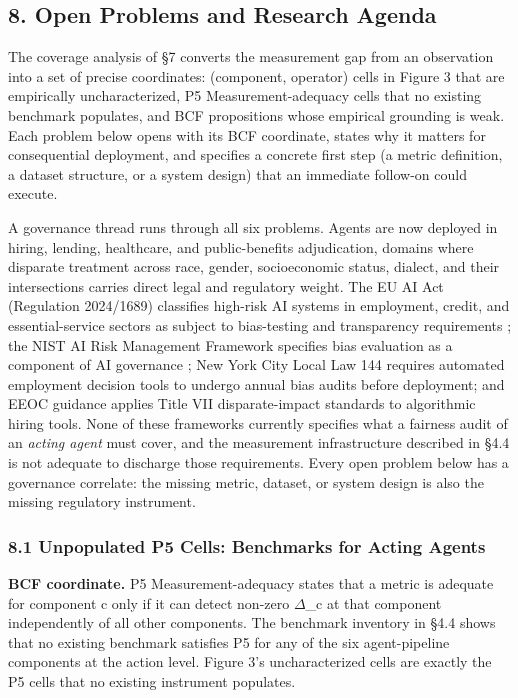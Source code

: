 \documentclass[10pt]{article}
\begin{document}
\subsection*{8. Open Problems and Research Agenda}

The coverage analysis of \S{}7 converts the measurement gap from an observation into a set of precise coordinates: (component, operator) cells in Figure 3 that are empirically uncharacterized, P5 Measurement-adequacy cells that no existing benchmark populates, and BCF propositions whose empirical grounding is weak. Each problem below opens with its BCF coordinate, states why it matters for consequential deployment, and specifies a concrete first step (a metric definition, a dataset structure, or a system design) that an immediate follow-on could execute.

A governance thread runs through all six problems. Agents are now deployed in hiring, lending, healthcare, and public-benefits adjudication, domains where disparate treatment across race, gender, socioeconomic status, dialect, and their intersections carries direct legal and regulatory weight. The EU AI Act (Regulation 2024/1689) classifies high-risk AI systems in employment, credit, and essential-service sectors as subject to bias-testing and transparency requirements \cite{parliament2024regulation}; the NIST AI Risk Management Framework specifies bias evaluation as a component of AI governance \cite{nist2023artificial}; New York City Local Law 144 requires automated employment decision tools to undergo annual bias audits before deployment; and EEOC guidance applies Title VII disparate-impact standards to algorithmic hiring tools. None of these frameworks currently specifies what a fairness audit of an \emph{acting agent} must cover, and the measurement infrastructure described in \S{}4.4 is not adequate to discharge those requirements. Every open problem below has a governance correlate: the missing metric, dataset, or system design is also the missing regulatory instrument.

\subsubsection*{8.1 Unpopulated P5 Cells: Benchmarks for Acting Agents}

\textbf{BCF coordinate.} P5 Measurement-adequacy states that a metric is adequate for component c only if it can detect non-zero $\Delta$\_c at that component independently of all other components. The benchmark inventory in \S{}4.4 shows that no existing benchmark satisfies P5 for any of the six agent-pipeline components at the action level. Figure 3's uncharacterized cells are exactly the P5 cells that no existing instrument populates.
\end{document}
